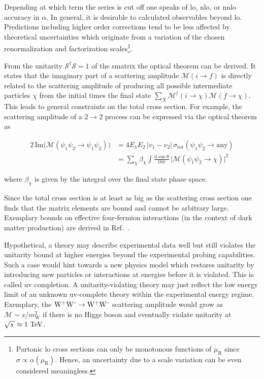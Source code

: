 
Depending at which term the series is cut off one speaks of \gls{lo}, \gls{nlo}, or \gls{nnlo} accuracy in $\alpha$. In general, it is desirable to calculated observables beyond \gls{lo}. Predictions including higher order corrections tend to be less affected by theoretical uncertainties which originate from a variation of the chosen renormalization and factorization scales\footnote{Partonic \gls{lo} cross sections can only be monotonous functions of $\mu_\mathrm{R}$ since $\sigma\propto\alpha(\mu_\mathrm{R})$. Hence, an uncertainty due to a scale variation can be even considered meaningless.}.

From the unitarity $\mathcal{S}^{\dagger}\mathcal{S}=1$ of the \gls{smatrix} the optical theorem can be derived. It states that the imaginary part of a scattering amplitude $\mathcal{M}(i\to f)$ is directly related to the scattering amplitude of producing all possible intermediate particles $\chi$ from the initial times the final state $\sum_{X}\mathcal{M}^\dagger(i\to \chi)\mathcal{M}(f\to \chi)$. This leads to general constraints on the total cross section. For example, the scattering amplitude of a $2\to2$ process can be expressed via the optical theorem as

\begin{align}
2\,\mathrm{Im}\Big(\mathcal{M}(\psi_{1}\psi_{2}\to\psi_{1}\psi_{2})\Big)&=4E_1E_2\,|v_1-v_2|\,\sigma_\mathrm{tot}(\psi_{1}\psi_{2}\to\mathrm{any})\\
&=\sum_{\chi}\beta_{\chi}\int\frac{\mathrm{d}\cos\theta}{16\pi}\,\big|\mathcal{M}(\psi_{1}\psi_{2}\to \chi)\big|^2
\end{align}

where $\beta_{\chi}$ is given by the integral over the final state phase space.

Since the total cross section is at least as big as the scattering cross section one finds that the matrix elements are bound and cannot be arbitrary large. Exemplary bounds on effective four-fermion interactions (in the context of dark matter production) are derived in Ref.~\cite{Endo:2014mja}. 

Hypothetical, a theory may describe experimental data well but still violates the unitarity bound at higher energies beyond the experimental probing capabilities. Such a case would hint towards a new physics model which restores unitarity by introducing new particles or interactions at energies before it is violated. This is called \gls{uv} completion. A unitarity-violating theory may just reflect the low energy limit of an unknown \gls{uv}-complete theory within the experimental energy regime. Exemplary,  the $\mathrm{W}^{\rmplus}\mathrm{W}^{\rmminus}\to\mathrm{W}^{\rmplus}\mathrm{W}^{\rmminus}$ scattering amplitude would grow as $\mathcal{M}\sim s/m_\mathrm{W}^2$ if there is no Higgs boson and eventually violate unitarity at $\sqrt{s}\approx1~\TeV$.


